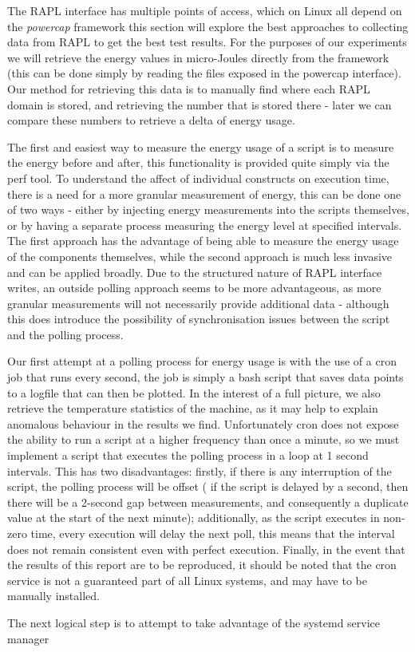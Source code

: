 The RAPL interface has multiple points of access, which on Linux all depend on the \textit{powercap}
framework\cite{LinuxPowerCap} this section will explore the best approaches to collecting data from RAPL to get the best
test results.
For the purposes of our experiments we will retrieve the energy values in micro-Joules directly from the framework (this
can be done simply by reading the files exposed in the powercap interface).
Our method for retrieving this data is to manually find where each RAPL domain is stored, and retrieving the number that
is stored there - later we can compare these numbers to retrieve a delta of energy usage.

The first and easiest way to measure the energy usage of a script is to measure the energy before and after, this
functionality is provided quite simply via the perf tool.
To understand the affect of individual constructs on execution time, there is a need for a more granular measurement of
energy, this can be done one of two ways - either by injecting energy measurements into the scripts themselves, or
by having a separate process measuring the energy level at specified intervals.
The first approach has the advantage of being able to measure the energy usage of the components themselves, while the
second approach is much less invasive and can be applied broadly.
Due to the structured nature of RAPL interface writes, an outside polling approach seems to be more advantageous, as
more granular measurements will not necessarily provide additional data - although this does introduce the possibility
of synchronisation issues between the script and the polling process.

Our first attempt at a polling process for energy usage is with the use of a cron job that runs every second, the job
is simply a bash script that saves data points to a logfile that can then be plotted.
In the interest of a full picture, we also retrieve the temperature statistics of the machine, as it may help to
explain anomalous behaviour in the results we find.
Unfortunately cron does not expose the ability to run a script at a higher frequency than once a minute, so we must
implement a script that executes the polling process in a loop at 1 second intervals.
This has two disadvantages: firstly, if there is any interruption of the script, the polling process will be offset (
if the script is delayed by a second, then there will be a 2-second gap between measurements, and consequently a
duplicate value at the start of the next minute); additionally, as the script executes in non-zero time, every execution
will delay the next poll, this means that the interval does not remain consistent even with perfect execution.
Finally, in the event that the results of this report are to be reproduced, it should be noted that the cron service is
not a guaranteed part of all Linux systems, and may have to be manually installed.

The next logical step is to attempt to take advantage of the systemd service manager


